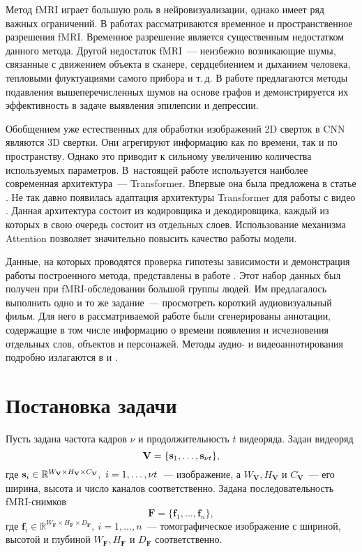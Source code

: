 \documentclass[a4paper, 12pt]{article}
\begin{document}
	Метод fMRI играет большую роль в нейровизуализации, однако имеет ряд важных ограничений.
	В работах \citep{menon1999spatial, logothetis2008we} рассматриваются 
	временное и пространственное разрешения fMRI. Временное разрешение является существенным
	недостатком данного метода. Другой недостаток fMRI~--- неизбежно возникающие шумы, 
	связанные с движением объекта в сканере, сердцебиением и дыханием человека, тепловыми
	флуктуациями самого прибора и т.\,д. В работе \citep{1804.10167} предлагаются методы 
	подавления вышеперечисленных шумов на основе графов и демонстрируется их эффективность в задаче
	выявления эпилепсии и депрессии.

	Обобщением уже естественных для обработки изображений 2D сверток в CNN являются 3D свертки.
	Они агрегируют информацию как по времени, так и по пространству.
	Однако это приводит к сильному увеличению количества используемых параметров.
	В~настоящей работе используется наиболее современная архитектура~--- Transformer.
	Впервые она была предложена в статье \citep{https://doi.org/10.48550/arxiv.1706.03762}.
	Не так давно появилась адаптация архитектуры Transformer для работы с видео
	\citep{https://doi.org/10.48550/arxiv.2201.04288}. Данная архитектура состоит из кодировщика
	и декодировщика, каждый из которых в свою очередь состоит из отдельных слоев. Использование 
	механизма Attention \citep{https://doi.org/10.48550/arxiv.1706.03762} 
	позволяет значительно повысить качество работы модели.

	Данные, на которых проводятся проверка гипотезы зависимости и демонстрация работы построенного 
	метода, представлены в работе \citep{Berezutskaya2022}. Этот набор данных был получен при
	fMRI-обследовании большой группы людей. Им предлагалось выполнить одно и то же задание~---
	просмотреть короткий аудиовизуальный фильм. Для него в рассматриваемой работе были 
	сгенерированы аннотации, содержащие в том числе информацию о времени появления и исчезновения
	отдельных слов, объектов и персонажей. Методы аудио- и видеоаннотирования подробно излагаются в
	\citep{boersma2018praat} и \citep{Berezutskaya2020}. 

\section{Постановка задачи}

	Пусть задана частота кадров $\nu$ и продолжительность $t$ видеоряда. 
	Задан видеоряд
	\begin{equation}
		\mathbf{V} = \{\mathbf{s}_1, \ldots, \mathbf{s}_{\nu t}\},
	\end{equation}
	где $\mathbf{s}_i \in \mathbb{R}^{W_{\mathbf{V}} \times H_{\mathbf{V}} \times C_{\mathbf{V}}},
	\ i = 1, \ldots, \nu t$~--- изображение, а $W_{\mathbf{V}}, H_{\mathbf{V}}$ и 
	$C_{\mathbf{V}}$~--- его ширина, высота и число каналов соответственно.
	Задана последовательность fMRI-снимков
	\begin{equation}
		\mathbf{F} = \{\mathbf{f}_1, \ldots, \mathbf{f}_n\},
	\end{equation}
	где $\mathbf{f}_i \in \mathbb{R}^{W_{\mathbf{F}} \times H_{\mathbf{F}} \times D_{\mathbf{F}}},
	\ i = 1, \ldots, n$~--- томографическое изображение с шириной, высотой и глубиной
	$W_{\mathbf{F}}, H_{\mathbf{F}}$ и $D_{\mathbf{F}}$ соответственно. 
\end{document}
